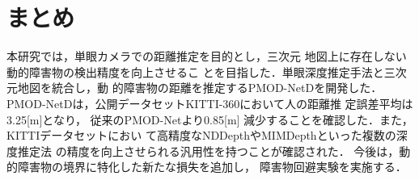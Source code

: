 \section{まとめ}
本研究では，単眼カメラでの距離推定を目的とし，三次元
地図上に存在しない動的障害物の検出精度を向上させるこ
とを目指した．単眼深度推定手法と三次元地図を統合し，動
的障害物の距離を推定するPMOD-NetDを開発した．PMOD-NetDは，公開データセットKITTI-360において人の距離推
定誤差平均は3.25[m]となり，
従来のPMOD-Netより0.85[m]
減少することを確認した．また，KITTIデータセットにおい
て高精度なNDDepthやMIMDepthといった複数の深度推定法
の精度を向上させられる汎用性を持つことが確認された．
今後は，動的障害物の境界に特化した新たな損失を追加し，
障害物回避実験を実施する．